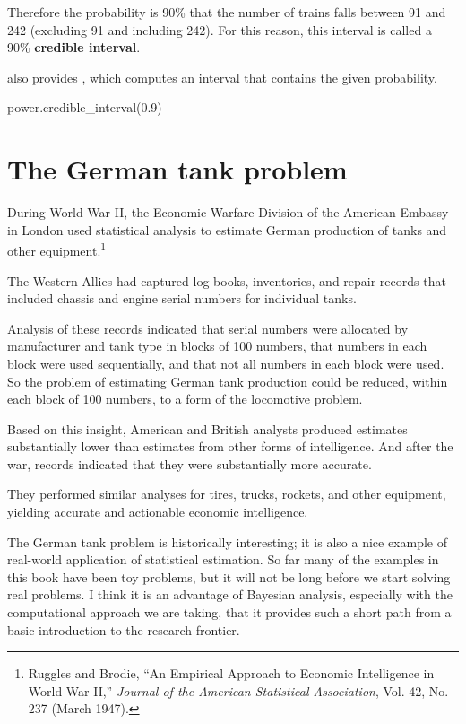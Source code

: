 \documentclass[12pt]{book}
\theoremstyle{exercise}
\begin{document}
Therefore the probability is 90\% that the number of trains falls between 91 and 242 (excluding 91 and including 242).
For this reason, this interval is called a 90\% {\bf credible interval}.

 also provides , which computes an interval that contains the given probability.

\begin{code}
power.credible_interval(0.9)
\end{code}




\section{The German tank problem}

During World War II, the Economic Warfare Division of the American
Embassy in London used statistical analysis to estimate German
production of tanks and other equipment.\footnote{Ruggles and Brodie,
  ``An Empirical Approach to Economic Intelligence in World War II,''
  {\em Journal of the American Statistical Association}, Vol. 42,
  No. 237 (March 1947).}

The Western Allies had captured log books, inventories, and repair
records that included chassis and engine serial numbers for individual
tanks.

Analysis of these records indicated that serial numbers were allocated
by manufacturer and tank type in blocks of 100 numbers, that numbers
in each block were used sequentially, and that not all numbers in each
block were used.  So the problem of estimating German tank production
could be reduced, within each block of 100 numbers, to a form of the
locomotive problem.

Based on this insight, American and British analysts produced
estimates substantially lower than estimates from other forms
of intelligence.  And after the war, records indicated that they were
substantially more accurate.

They performed similar analyses for tires, trucks, rockets, and other
equipment, yielding accurate and actionable economic intelligence.

The German tank problem is historically interesting; it is also a nice
example of real-world application of statistical estimation.  So far
many of the examples in this book have been toy problems, but it will
not be long before we start solving real problems.  I think it is an
advantage of Bayesian analysis, especially with the computational
approach we are taking, that it provides such a short path from a
basic introduction to the research frontier.
\end{document}
